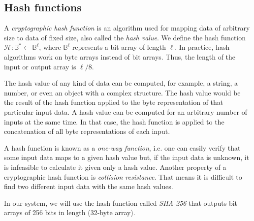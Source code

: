 \clearpage
\subsection{Hash functions} \label{app: hash functions}
A \textit{cryptographic hash function} is an algorithm used for mapping data of arbitrary size to data of fixed size, also called the \textit{hash value}. We define the hash function $\mathcal{H} : \mathbb{B}^* \gets \mathbb{B}^\ell$, where $\mathbb{B}^\ell$ represents a bit array of length $\ell$. In practice, hash algorithms work on byte arrays instead of bit arrays. Thus, the length of the input or output array is $\ell/8$.

The hash value of any kind of data can be computed, for example, a string, a number, or even an object with a complex structure. The hash value would be the result of the hash function applied to the byte representation of that particular input data. A hash value can be computed for an arbitrary number of inputs at the same time. In that case, the hash function is applied to the concatenation of all byte representations of each input.

A hash function is known as a \textit{one-way function}, i.e. one can easily verify that some input data maps to a given hash value but, if the input data is unknown, it is infeasible to calculate it given only a hash value. Another property of a cryptographic hash function is \textit{collision resistance}. That means it is difficult to find two different input data with the same hash values.

In our system, we will use the hash function called \textit{SHA-256} that outputs bit arrays of 256 bits in length (32-byte array).
